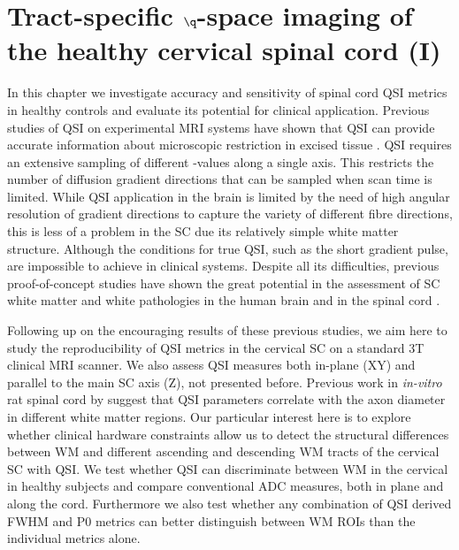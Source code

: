 \chapter{Tract-specific $\q$-space imaging of the healthy cervical spinal cord (I)}
\label{chapter5}
\glsresetall %
In this chapter we investigate accuracy and sensitivity of spinal cord \gls{QSI} metrics in healthy controls and evaluate its potential for clinical application. Previous studies of \gls{QSI} on experimental MRI systems have shown that \gls{QSI} can provide accurate information about microscopic restriction in excised tissue \citep{Assaf:2000,Bar-Shir:2008,Ong:2008}. \Gls{QSI} requires an extensive sampling of different {\q}-values along a single axis. This restricts the number of diffusion gradient directions that can be sampled when scan time is limited. While \gls{QSI} application in the brain is limited by the need of high angular resolution of gradient directions to capture the variety of different fibre directions, this is less of a problem in the \gls{SC} due its relatively simple white matter structure. Although the conditions for true \gls{QSI}, such as the short gradient pulse, are impossible to achieve in clinical systems. Despite all its difficulties, previous proof-of-concept studies have shown the great potential in the assessment of {\gls{SC}} white matter and white pathologies in the human brain \citep{Assaf:2002,Yamada:2012} and in the spinal cord \citep{Farrell:2008}.

Following up on the encouraging results of these previous studies, we aim here to study the reproducibility of \gls{QSI} metrics in the cervical {\gls{SC}} on a standard 3T clinical MRI scanner. We also assess \gls{QSI} measures both in-plane (XY) and parallel to the main {\gls{SC}} axis (Z), not presented before. Previous work in \emph{in-vitro} rat spinal cord by \citet{Ong:2008,Ong:2010} suggest that \gls{QSI} parameters correlate with the axon diameter in different white matter regions. Our particular interest here is to explore whether clinical hardware constraints allow us to detect the structural differences between \gls{WM} and different ascending and descending \gls{WM} tracts of the cervical {\gls{SC}} with \gls{QSI}. We test whether \gls{QSI} can discriminate between \gls{WM} in the cervical in healthy subjects and compare conventional \gls{ADC} measures, both in plane and along the cord. Furthermore we also test whether any combination of \gls{QSI} derived FWHM and P0 metrics can better distinguish between WM \glspl{ROI} than the individual metrics alone.

